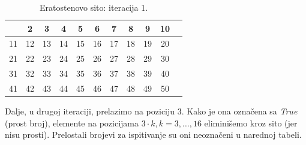 
\begin{table}[H]
	\centering
	\begin{tabular}{|c|c|c|c|c|c|c|c|c|c|c} \hline
		& 2 & 3 & \cellcolor{red!30}  4 & 5 & \cellcolor{red!30} 6 & 7 & \cellcolor{red!30} 8 & 9 & \cellcolor{red!30} 10 \\ \hline
		11 &\cellcolor{red!30}  12 & 13 & \cellcolor{red!30} 14 & 15 & \cellcolor{red!30} 16 & 17 & \cellcolor{red!30} \cellcolor{red!30} 18 & 19 & \cellcolor{red!30} \cellcolor{red!30} 20 \\ \hline
		21 & \cellcolor{red!30} 22 & 23 & \cellcolor{red!30} 24 & 25 & \cellcolor{red!30} 26 & 27 &\cellcolor{red!30}  28 & 29 & \cellcolor{red!30} \cellcolor{red!30} 30 \\ \hline
		31 & \cellcolor{red!30} 32 & 33 & \cellcolor{red!30} 34 & 35 & \cellcolor{red!30} 36 & 37 & \cellcolor{red!30} 38 & 39 & \cellcolor{red!30} 40 \\ \hline
		41 & \cellcolor{red!30} 42 & 43 & \cellcolor{red!30} 44 & 45 & \cellcolor{red!30} 46 & 47 &\cellcolor{red!30}  48 & 49 &\cellcolor{red!30}  50 \\ \hline     
	\end{tabular}
        \caption{Eratostenovo sito: iteracija 1.} \label{eratosten-sieve-it-1}
\end{table}



Dalje, u drugoj iteraciji, prelazimo na poziciju 3. Kako je ona označena sa \emph{True} (prost broj), elemente na pozicijama $3\cdot k, k=3, \ldots, 16$ eliminišemo kroz sito (jer nisu prosti). Prelostali brojevi za ispitivanje su oni neoznačeni u narednoj tabeli. 


